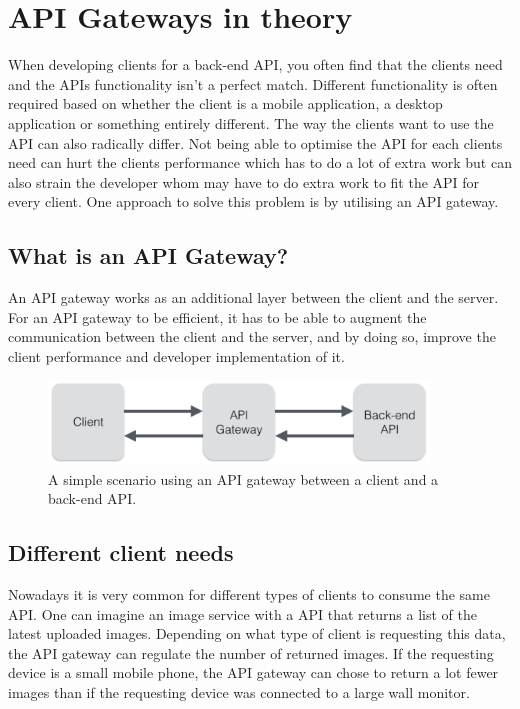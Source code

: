 \documentclass{cslthse-msc}
\begin{document}
\chapter{API Gateways in theory}
When developing clients for a back-end API, you often find that the clients need and the APIs functionality isn't a perfect match. Different functionality is often required based on whether the client is a mobile application, a desktop application or something entirely different. The way the clients want to use the API can also radically differ. Not being able to optimise the API for each clients need can hurt the clients performance which has to do a lot of extra work but can also strain the developer whom may have to do extra work to fit the API for every client. One approach to solve this problem is by utilising an API gateway.

\section{What is an API Gateway?}
An API gateway works as an additional layer between the client and the server. For an API gateway to be efficient, it has to be able to augment the communication between the client and the server, and by doing so, improve the client performance and developer implementation of it.

\begin{figure}[H]
  \centering
    \begin{center}
      \includegraphics[width=0.9\textwidth]{images/api_gateway.png}
    \end{center}
  \caption{A simple scenario using an API gateway between a client and a back-end API.}
\end{figure}

\section{Different client needs}
Nowadays it is very common for different types of clients to consume the same API. One can imagine an image service with a API that returns a list of the latest uploaded images. Depending on what type of client is requesting this data, the API gateway can regulate the number of returned images. If the requesting device is a small mobile phone, the API gateway can chose to return a lot fewer images than if the requesting device was connected to a large wall monitor.
\end{document}
